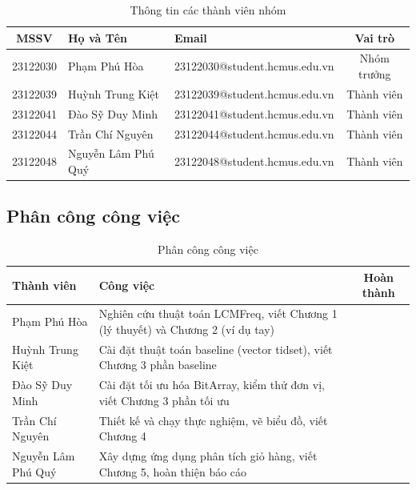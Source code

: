 \documentclass[12pt,a4paper]{article}
\newcommand{\cmark}{\ding{51}}
\theoremstyle{definition}
\begin{document}
\begin{table}[H]
\centering
\small
\begin{tabular}{c l l c}
    \toprule
    \textbf{MSSV} & \textbf{Họ và Tên} & \textbf{Email} & \textbf{Vai trò} \\
    \midrule
    23122030 & Phạm Phú Hòa       & 23122030@student.hcmus.edu.vn & Nhóm trưởng \\
    23122039 & Huỳnh Trung Kiệt   & 23122039@student.hcmus.edu.vn & Thành viên \\
    23122041 & Đào Sỹ Duy Minh    & 23122041@student.hcmus.edu.vn & Thành viên \\
    23122044 & Trần Chí Nguyên    & 23122044@student.hcmus.edu.vn & Thành viên \\
    23122048 & Nguyễn Lâm Phú Quý & 23122048@student.hcmus.edu.vn & Thành viên \\
    \bottomrule
\end{tabular}
\caption{Thông tin các thành viên nhóm}
\label{tab:team_info}
\end{table}

\subsection{Phân công công việc}

\begin{table}[H]
\centering
\small
\begin{tabularx}{\textwidth}{l X c}
    \toprule
    \textbf{Thành viên} & \textbf{Công việc} & \textbf{Hoàn thành} \\
    \midrule
    Phạm Phú Hòa       & Nghiên cứu thuật toán LCMFreq, viết Chương 1 (lý thuyết) và Chương 2 (ví dụ tay) & \cmark \\[4pt]
    Huỳnh Trung Kiệt   & Cài đặt thuật toán baseline (vector tidset), viết Chương 3 phần baseline & \cmark \\[4pt]
    Đào Sỹ Duy Minh    & Cài đặt tối ưu hóa BitArray, kiểm thử đơn vị, viết Chương 3 phần tối ưu & \cmark \\[4pt]
    Trần Chí Nguyên    & Thiết kế và chạy thực nghiệm, vẽ biểu đồ, viết Chương 4 & \cmark \\[4pt]
    Nguyễn Lâm Phú Quý & Xây dựng ứng dụng phân tích giỏ hàng, viết Chương 5, hoàn thiện báo cáo & \cmark \\
    \bottomrule
\end{tabularx}
\caption{Phân công công việc}
\label{tab:work_dist}
\end{table}
\end{document}
